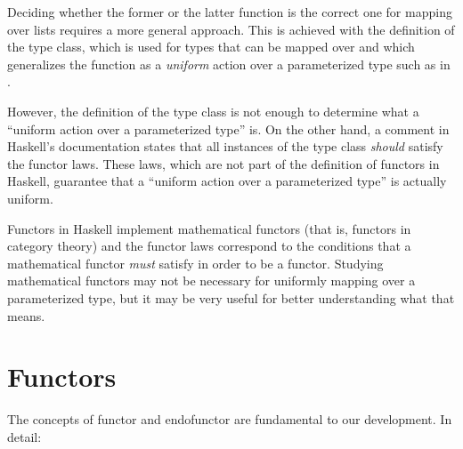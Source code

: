 Deciding whether the former or the latter  function
is the correct one for mapping over lists requires a more general
approach. This is achieved with the definition of the
 type class, which is used for types that can be
mapped over and which generalizes the  function as a
\emph{uniform} action over a parameterized type such as
\texthaskell{[a]} in .

However, the definition of the  type class is not
enough to determine what a ``uniform action over a parameterized
type'' is. On the other hand, a comment in Haskell's documentation
states that all instances of the  type class
\emph{should} satisfy the functor laws. These laws, which are not part
of the definition of functors in Haskell, guarantee that a ``uniform
action over a parameterized type'' is actually uniform.

Functors in Haskell implement mathematical functors (that is, functors
in category theory) and the functor laws correspond to the conditions
that a mathematical functor \emph{must} satisfy in order to be a
functor. Studying mathematical functors may not be necessary for
uniformly mapping over a parameterized type, but it may be very useful
for better understanding what that means.

\section{Functors}
\label{sec:functors}

The concepts of functor and endofunctor are fundamental to our
development. In detail:

